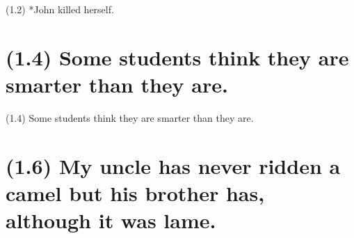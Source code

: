 \documentclass{article}
\begin{document}
\bigbreak
\begin{enumerate*}
\item[(1.2)] *John killed herself.
\end{enumerate*}
\bigbreak

\bigbreak
\begin{minipage}{\textwidth}
\end{minipage}
\bigbreak

\clearpage

%
%

\section*{(1.4) Some students think they are smarter than they are.}

\bigbreak
\begin{enumerate*}
\item[(1.4)] Some students think they are smarter than they are.
\end{enumerate*}
\bigbreak

\bigbreak
\begin{minipage}{\textwidth}
\end{minipage}
\bigbreak

\clearpage

%
%

\section*{(1.6) My uncle has never ridden a camel but his brother has, although it was lame.}
\end{document}
